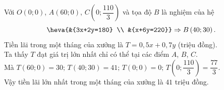 \begin{ex}
{\begin{itemchoice}
			Với $O\left(0; 0\right)$, $A\left(60; 0\right)$, $C\left(0; \dfrac{110}{3} \right)$ và tọa độ $B$ là nghiệm của hệ  
			$$\heva{&{3x+2y=180} \\ &{x+6y=220}} \Rightarrow B\left(40; 30\right).$$
			Tiền lãi trong một tháng của xưởng là $T=0{,}5x+0{,}7y$ (triệu đồng).\\
			Ta thấy $T$ đạt giá trị lớn nhất chỉ có thể tại các điểm $A$, $B$, $C$.\\
			Mà $T\left(60;0\right)=30;\, T\left(40;30\right)=41;\, T\left(0;0\right)=0;\, T\left(0;\dfrac{110}{3} \right)=\dfrac{77}{3}$.\\
			Vậy tiền lãi lớn nhất trong một tháng của xưởng là $41$ triệu đồng.
		\end{itemchoice} 
	} 
\end{ex}

